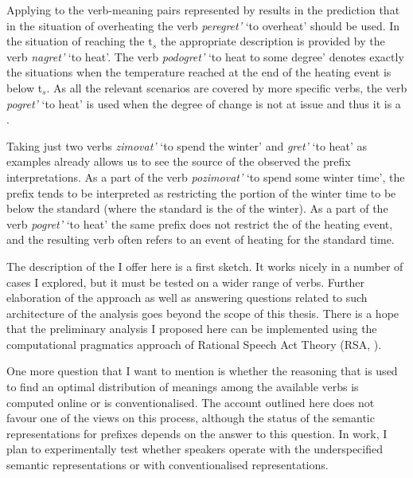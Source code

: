 Applying  to the verb-meaning pairs represented by  results in the prediction that in the situation of overheating the verb \textit{peregret'} `to overheat' should be used. In the situation of reaching the t$_s$ the appropriate description is provided by the verb \textit{nagret'} `to heat'. The verb \textit{podogret'} `to heat to some degree' denotes exactly the situations when the temperature reached at the end of the heating event is below t$_s$. As all the relevant scenarios are covered by more specific verbs, the verb \textit{pogret'} `to heat' is used when the degree of change is not at issue and thus it is a .

Taking just two verbs \textit{zimovat'} `to spend the winter' and \textit{gret'} `to heat' as examples already allows us to see the source of the observed  the prefix interpretations. As a part of the verb \textit{pozimovat'} `to spend some winter time', the prefix  tends to be interpreted as restricting the portion of the winter time to be below the standard (where the standard is the  of the winter). As a part of the verb \textit{pogret'} `to heat' the same prefix does not restrict the  of the heating event, and the resulting verb often refers to an event of heating for the standard time. 

The description of the  I offer here is a first sketch. It works nicely in a number of cases I explored, but it must be tested on a wider range of verbs. Further elaboration of the approach as well as answering questions related to such architecture of the analysis goes beyond the scope of this thesis. There is a hope that the preliminary analysis I proposed here can be implemented using the computational pragmatics approach of Rational Speech Act Theory (RSA, \citealt{Franke:09, FrankGoodman:12, GoodmanStuhlmuller:13, FrankeJager:15, GoodmanFrank:16}). 

One more question that I want to mention is whether the reasoning that is used to find an optimal distribution of meanings among the available verbs is computed online or is conventionalised. The account outlined here does not favour one of the views on this process, although the status of the semantic representations for prefixes depends on the answer to this question. In  work, I plan to experimentally test whether speakers operate with the underspecified semantic representations or with conventionalised representations. 

